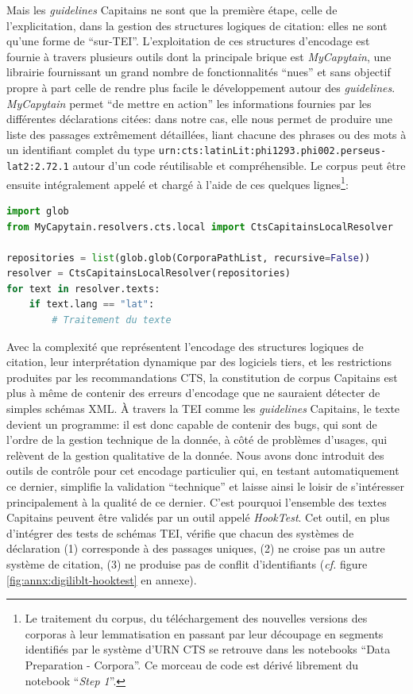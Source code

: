 Mais les \textit{guidelines} Capitains ne sont que la première étape, celle de l'explicitation, dans la gestion des structures logiques de citation: elles ne sont qu'une forme de \enquote{sur-TEI}. L'exploitation de ces structures d'encodage est fournie à travers plusieurs outils dont la principale brique est \textit{MyCapytain}, une librairie fournissant un grand nombre de fonctionnalités \enquote{nues} et sans objectif propre à part celle de rendre plus facile le développement autour des \textit{guidelines}. \textit{MyCapytain} permet \enquote{de mettre en action} les informations fournies par les différentes déclarations citées: dans notre cas, elle nous permet de produire une liste des passages extrêmement détaillées, liant chacune des phrases ou des mots à un identifiant complet du type \texttt{urn:cts:latinLit:phi1293.phi002.perseus-lat2:2.72.1} autour d'un code réutilisable et compréhensible. Le corpus peut être ensuite intégralement appelé et chargé à l'aide de ces quelques lignes\footnote{Le traitement du corpus, du téléchargement des nouvelles versions des corporas à leur lemmatisation en passant par leur découpage en segments identifiés par le système d'URN CTS se retrouve dans les notebooks \enquote{Data Preparation - Corpora}. Ce morceau de code est dérivé librement du notebook \enquote{\textit{Step 1}}.}:

\begin{lstlisting}[language=Python]
import glob
from MyCapytain.resolvers.cts.local import CtsCapitainsLocalResolver

repositories = list(glob.glob(CorporaPathList, recursive=False))
resolver = CtsCapitainsLocalResolver(repositories)
for text in resolver.texts:
    if text.lang == "lat":
        # Traitement du texte
\end{lstlisting}

Avec la complexité que représentent l'encodage des structures logiques de citation, leur interprétation dynamique par des logiciels tiers, et les restrictions produites par les recommandations CTS, la constitution de corpus Capitains est plus à même de contenir des erreurs d'encodage que ne sauraient détecter de simples schémas XML. À travers la TEI comme les \textit{guidelines} Capitains, le texte devient un programme: il est donc capable de contenir des bugs, qui sont de l'ordre de la gestion technique de la donnée, à côté de problèmes d'usages, qui relèvent de la gestion qualitative de la donnée. Nous avons donc introduit des outils de contrôle pour cet encodage particulier qui, en testant automatiquement ce dernier, simplifie la validation \enquote{technique} et laisse ainsi le loisir de s'intéresser principalement à la qualité de ce dernier. C'est pourquoi l'ensemble des textes Capitains peuvent être validés par un outil appelé \textit{HookTest}. Cet outil, en plus d'intégrer des tests de schémas TEI, vérifie que chacun des systèmes de déclaration (1) corresponde à des passages uniques, (2) ne croise pas un autre système de citation, (3) ne produise pas de conflit d'identifiants (\textit{cf.} figure \ref{fig:annx:digiliblt-hooktest} en annexe).

